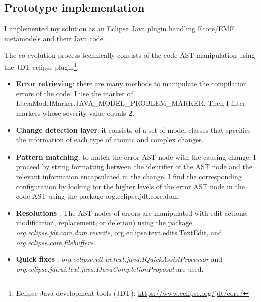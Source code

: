 
\subsection{Prototype implementation}
I implemented my solution as an Eclipse Java plugin handling Ecore/EMF metamodels and their Java code. 

The co-evolution process technically consists of the code AST manipulation using the JDT eclipse plugin\footnote{Eclipse Java development tools (JDT): \url{https://www.eclipse.org/jdt/core/}}.
\begin{itemize}
\item \textbf{Error retrieving}: there are many methods to manipulate the compilation errors of the code. I use the marker of IJavaModelMarker.JAVA\_MODEL\_PROBLEM\_MARKER. Then I filter markers whose severity value equals 2.
\item \textbf{Change detection layer}: it consists of a set of model classes that specifies the information of each type of atomic and complex changes. 
\item \textbf{Pattern matching}: to match the error AST node with the causing change, I proceed by string formatting between the identifier of the AST node and the relevant information encapsulated in the change. I find the corresponding configuration by looking for the higher levels of the error AST node in the code AST using the package org.eclipse.jdt.core.dom.
\item \textbf{Resolutions} :
The AST nodes of errors are manipulated with edit actions: modification, replacement, or deletion)  
using the package \textit{ org.eclipse.jdt.core.dom.rewrite}, org.eclipse.text.edits.TextEdit, and \textit{org.eclipse.core.filebuffers}. 
\item \textbf{Quick fixes} : \textit{org.eclipse.jdt.ui.text.java.IQuickAssistProcessor} and \textit{org.eclipse.jdt.ui.text.java.IJavaCompletionProposal} are used.

\end{itemize}


